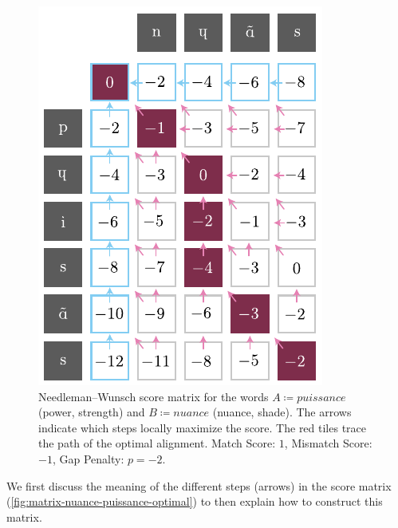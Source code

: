 \begin{figure}[H]
    \centering
    \includegraphics[width=0.77\linewidth]{assets/illustrator/matrix-nuance-puissance-optimal.pdf}
    \caption{Needleman–Wunsch score matrix for the words $A\coloneqq\textit{puissance}$  (power, strength) and $B\coloneqq\textit{nuance}$  (nuance, shade). The arrows indicate which steps locally maximize the score. The red tiles trace the path of the optimal alignment. Match Score: $1$, Mismatch Score: $-1$, Gap Penalty: $p=-2$.}
    \label{fig:matrix-nuance-puissance-optimal}
\end{figure}

\vfill\null

We first discuss the meaning of the different steps (arrows) in the score matrix (\autoref{fig:matrix-nuance-puissance-optimal}) to then explain how to construct this matrix.

